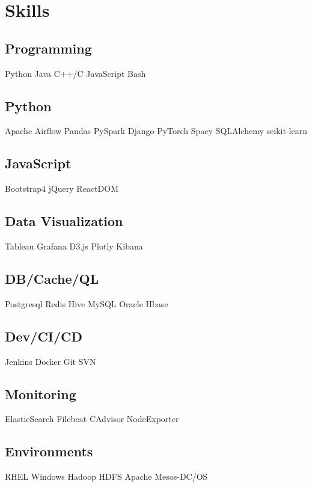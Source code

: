 \documentclass[]{Vishnu-Resume}
\begin{document}
\begin{minipage}[t]{0.33\textwidth}

\section{Skills}
\subsection{Programming}
Python \textbullet{} Java \textbullet{} C++/C  \textbullet{} JavaScript \textbullet{} Bash
\sectionsep

\subsection{Python}
Apache Airflow \textbullet{} Pandas \textbullet{} PySpark  \textbullet{} Django \textbullet{} PyTorch  \textbullet{} Spacy   \textbullet{} SQLAlchemy  \textbullet{} scikit-learn
\sectionsep

\subsection{JavaScript}
Bootstrap4 \textbullet{} jQuery \textbullet{} ReactDOM 
\sectionsep

\subsection{Data Visualization}
Tableau \textbullet{} Grafana \textbullet{} D3.js  \textbullet{} Plotly \textbullet{} Kibana
\sectionsep

\subsection{DB/Cache/QL}
 Postgresql  \textbullet{} Redis  \textbullet{} Hive  \textbullet{} MySQL  \textbullet{} Oracle  \textbullet{} Hbase
\sectionsep

\subsection{Dev/CI/CD}
Jenkins \textbullet{} Docker \textbullet{} Git \textbullet{} SVN
\sectionsep


\subsection{Monitoring}
ElasticSearch \textbullet{} Filebeat \textbullet{} CAdvisor \textbullet{} NodeExporter
\sectionsep

\subsection{Environments}
RHEL \textbullet{} Windows  \textbullet{} Hadoop HDFS \textbullet{} Apache Mesos-DC/OS
%
%

\end{minipage} 
\end{document}
